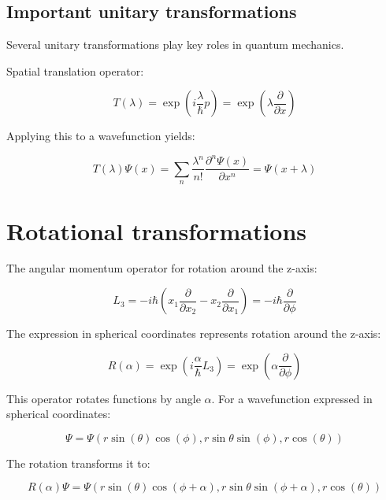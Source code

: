 \documentclass[italian]{HKNdocument}
\begin{document}
\subsection{Important unitary transformations}
Several unitary transformations play key roles in quantum mechanics.

Spatial translation operator:

\begin{equation}
T(\lambda)=\exp \left(i \frac{\lambda}{\hbar} p\right)=\exp \left(\lambda \frac{\partial}{\partial x}\right) \label{eq:10.47}
\end{equation}

Applying this to a wavefunction yields:

\begin{equation}
T(\lambda) \Psi(x)=\sum_{n} \frac{\lambda^{n}}{n!} \frac{\partial^{n} \Psi(x)}{\partial x^{n}}=\Psi(x+\lambda) \label{eq:10.48}
\end{equation}

\section{Rotational transformations}

The angular momentum operator for rotation around the z-axis:

\begin{equation}
L_{3}=-i \hbar\left(x_{1} \frac{\partial}{\partial x_{2}}-x_{2} \frac{\partial}{\partial x_{1}}\right)=-i \hbar \frac{\partial}{\partial \phi} \label{eq:10.49}
\end{equation}


The expression in spherical coordinates represents rotation around the z-axis:

\begin{equation}
R(\alpha)=\exp \left(i \frac{\alpha}{\hbar} L_{3}\right)=\exp \left(\alpha \frac{\partial}{\partial \phi}\right) \label{eq:10.50}
\end{equation}

This operator rotates functions by angle $\alpha$. For a wavefunction expressed in spherical coordinates:

\begin{equation}
\Psi=\Psi(r \sin (\theta) \cos (\phi), r \sin \theta \sin (\phi), r \cos (\theta)) \label{eq:10.51}
\end{equation}

The rotation transforms it to:

\begin{equation}
R(\alpha) \Psi=\Psi(r \sin (\theta) \cos (\phi+\alpha), r \sin \theta \sin (\phi+\alpha), r \cos (\theta)) \label{eq:10.52}
\end{equation}
\end{document}
